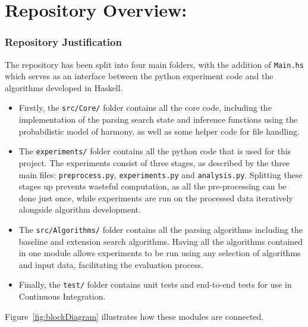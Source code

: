 \documentclass[12pt,a4paper,twoside,openright]{report}
\theoremstyle{definition}
\begin{document}
\section{Repository Overview:}

\subsubsection{Repository Justification}

The repository has been split into four main folders, with the addition of \texttt{Main.hs} which serves as an interface between the python experiment code and the algorithms developed in Haskell. 
\begin{itemize}
  \item Firstly, the \texttt{src/Core/} folder contains all the core code, including the implementation of the parsing search state and inference functions using the probabilistic model of harmony, as well as some helper code for file handling. 
  \item The \texttt{experiments/} folder contains all the python code that is used for this project. The experiments consist of three stages, as described by the three main files: \texttt{preprocess.py}, \texttt{experiments.py} and \texttt{analysis.py}. Splitting these stages up prevents wasteful computation, as all the pre-processing can be done just once, while experiments are run on the processed data iteratively alongside algorithm development. 
  \item The \texttt{src/Algorithms/} folder contains all the parsing algorithms including the baseline and extension search algorithms. Having all the algorithms contained in one module allows experiments to be run using any selection of algorithms and input data, facilitating the evaluation process.  
  \item Finally, the \texttt{test/} folder contains unit tests and end-to-end tests for use in Continuous Integration.
\end{itemize}

Figure~\ref{fig:blockDiagram} illustrates how these modules are connected. 
\end{document}
